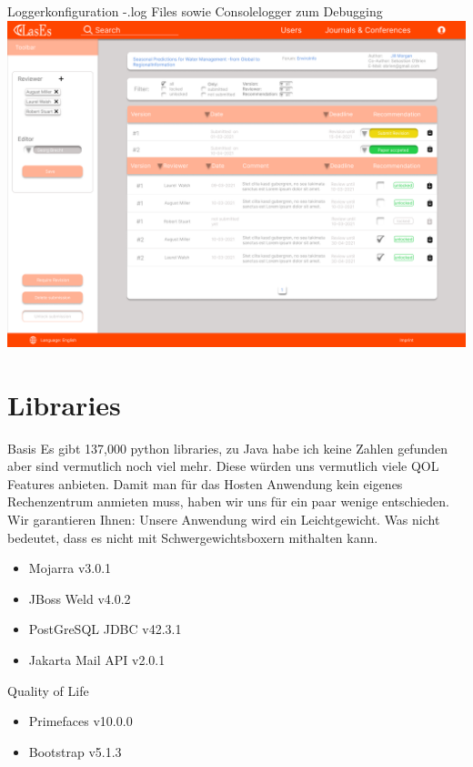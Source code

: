\documentclass{beamer}
\begin{document}
    \begin{frame}{Loggerkonfiguration}
        -.log Files sowie Consolelogger zum Debugging
        \centering
        \includegraphics[height=0.75\textheight]{../../docs/Pflichtenheft/graphics/Submission-png}
    \end{frame}


    \section{Libraries}
    \begin{frame}{Basis}
        Es gibt 137,000 python libraries, zu Java habe ich keine Zahlen gefunden aber sind vermutlich noch viel mehr.
        Diese würden uns vermutlich viele QOL Features anbieten.
        Damit man für das Hosten Anwendung kein eigenes Rechenzentrum anmieten muss,
        haben wir uns für ein paar wenige entschieden.
        Wir garantieren Ihnen: Unsere Anwendung wird ein Leichtgewicht.
        Was nicht bedeutet, dass es nicht mit Schwergewichtsboxern mithalten kann.
        \begin{itemize}
            \item Mojarra v3.0.1
            \item JBoss Weld v4.0.2
            \item PostGreSQL JDBC v42.3.1
            \item Jakarta Mail API v2.0.1
        \end{itemize}
    \end{frame}

    \begin{frame}{Quality of Life}
        \begin{itemize}
            \item Primefaces v10.0.0
            \item Bootstrap v5.1.3
        \end{itemize}
    \end{frame}
\end{document}
